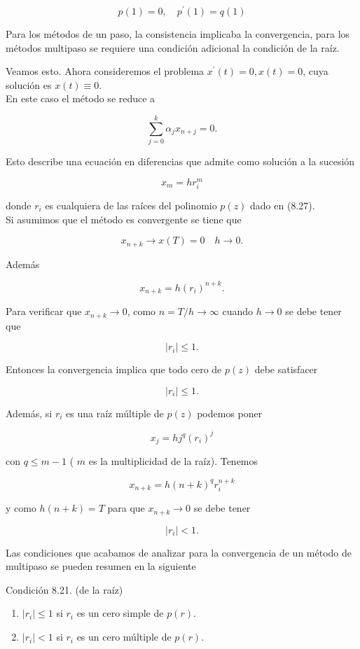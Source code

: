 \documentclass[10pt]{article}
\begin{document}
$$
p(1)=0, \quad p^{\prime}(1)=q(1)
$$

Para los métodos de un paso, la consistencia implicaba la convergencia, para los métodos multipaso se requiere una condición adicional la condición de la raíz.

Veamos esto. Ahora consideremos el problema $x^{\prime}(t)=0, x(t)=0$, cuya solución es $x(t) \equiv 0$.\\
En este caso el método se reduce a

$$
\sum_{j=0}^{k} \alpha_{j} x_{n+j}=0 .
$$

Esto describe una ecuación en diferencias que admite como solución a la sucesión

$$
x_{m}=h r_{i}^{m}
$$

donde $r_{i}$ es cualquiera de las raíces del polinomio $p(z)$ dado en (8.27).\\
Si asumimos que el método es convergente se tiene que

$$
x_{n+k} \rightarrow x(T)=0 \quad h \rightarrow 0 .
$$

Además

$$
x_{n+k}=h\left(r_{i}\right)^{n+k} .
$$

Para verificar que $x_{n+k} \rightarrow 0$, como $n=T / h \rightarrow \infty$ cuando $h \rightarrow 0$ se debe tener que

$$
\left|r_{i}\right| \leq 1 .
$$

Entonces la convergencia implica que todo cero de $p(z)$ debe satisfacer

$$
\left|r_{i}\right| \leq 1 .
$$

Además, si $r_{i}$ es una raíz múltiple de $p(z)$ podemos poner

$$
x_{j}=h j^{q}\left(r_{i}\right)^{j}
$$

con $q \leq m-1$ ( $m$ es la multiplicidad de la raíz). Tenemos

$$
x_{n+k}=h(n+k)^{q} r_{i}^{n+k}
$$

y como $h(n+k)=T$ para que $x_{n+k} \rightarrow 0$ se debe tener

$$
\left|r_{i}\right|<1 .
$$

Las condiciones que acabamos de analizar para la convergencia de un método de multipaso se pueden resumen en la siguiente

Condición 8.21. (de la raíz)

\begin{enumerate}
  \item $\left|r_{i}\right| \leq 1$ si $r_{i}$ es un cero simple de $p(r)$.
  \item $\left|r_{i}\right|<1$ si $r_{i}$ es un cero múltiple de $p(r)$.
\end{enumerate}
\end{document}

